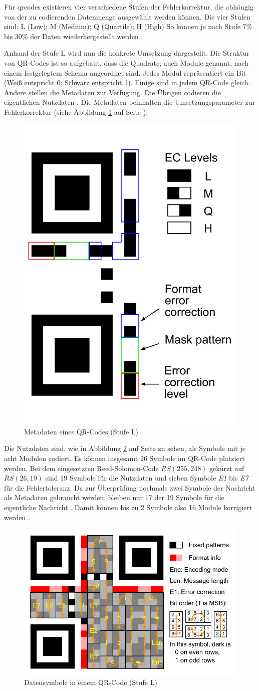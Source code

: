Für \acrshort{qrcode}s existieren vier verschiedene Stufen der Fehlerkorrektur, die abhängig von der zu codierenden Datenmenge ausgewählt werden können. 
Die vier Stufen sind: L (Low); M (Medium); Q (Quartile); H (High)
So können je nach Stufe 7\% bis 30\% der Daten wiederhergestellt werden \cite{tiwariIntroductionQRCode2016}.

Anhand der Stufe L wird nun die konkrete Umsetzung dargestellt.
Die Struktur von QR-Codes ist so aufgebaut, dass die Quadrate, auch Module genannt, nach einem festgelegtem Schema angeordnet sind.
Jedes Modul repräsentiert ein Bit (Weiß entspricht 0; Schwarz entspricht 1).
Einige sind in jedem QR-Code gleich. Andere stellen die Metadaten zur Verfügung.
Die Übrigen codieren die eigentlichen Nutzdaten \cite{tiwariIntroductionQRCode2016}.
Die Metadaten beinhalten die Umsetzungsparameter zur Fehlerkorrektur (siehe Abbildung \ref{fig:qrschema} auf Seite \pageref{fig:qrschema}).
\begin{figure}[ht]
	\centering
	\includegraphics[height=0.4\textwidth]{figures/QR_Format_Information.pdf}
	\caption[Metadaten eines QR-Codes (Stufe L)]{Metadaten eines QR-Codes (Stufe L) \cite{QRCode2024}}
	\label{fig:qrschema}
\end{figure}
Die Nutzdaten sind, wie in Abbildung \ref{fig:qrdata} auf Seite \pageref{fig:qrdata} zu sehen, als Symbole mit je acht Modulen codiert.
Es können insgesamt 26 Symbole im QR-Code platziert werden.
Bei dem eingesetzten Reed-Solomon-Code $RS(255,248)$ gekürzt auf $RS(26,19)$ sind 19 Symbole für die Nutzdaten und sieben Symbole \textit{E1} bis \textit{E7} für die Fehlertoleranz.
Da zur Überprüfung nochmals zwei Symbole der Nachricht als Metadaten gebraucht werden, bleiben nur 17 der 19 Symbole für die eigentliche Nachricht \cite{pillazoHowDecodeQR2013}.
Damit können bis zu 2 Symbole also 16 Module korrigiert werden \cite{QRCode2024}.
\begin{figure}[ht]
	\centering
	\includegraphics[height=0.4\textwidth]{figures/QR_Character_Placement.pdf}
	\caption[Datensymbole in einem QR-Code (Stufe L)]{Datensymbole in einem QR-Code (Stufe L) \cite{QRCode2024}}
	\label{fig:qrdata}
\end{figure}

